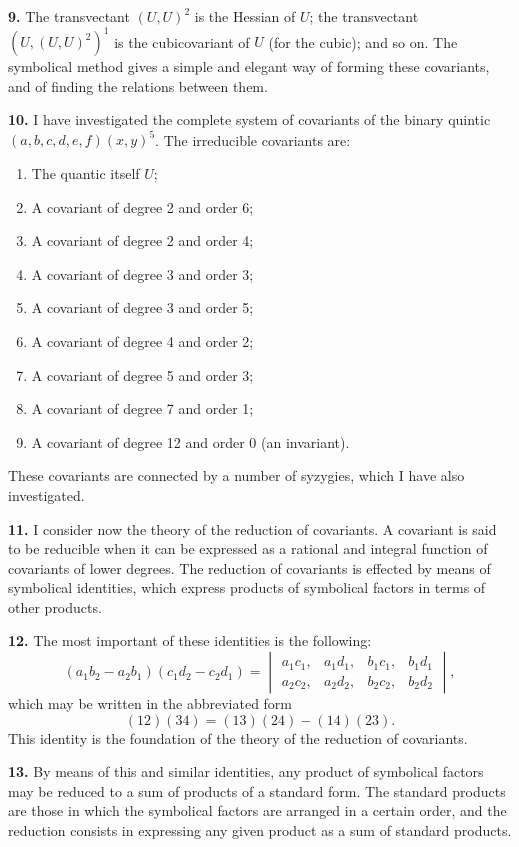 \documentclass[12pt,a4paper]{article}
\begin{document}
\newpage
\setcounter{page}{250}

\textbf{9.} The transvectant $(U, U)^2$ is the Hessian of $U$; the transvectant $(U, (U, U)^2)^1$ is the cubicovariant of $U$ (for the cubic); and so on. The symbolical method gives a simple and elegant way of forming these covariants, and of finding the relations between them.

\textbf{10.} I have investigated the complete system of covariants of the binary quintic $(a, b, c, d, e, f)(x, y)^5$. The irreducible covariants are:
\begin{enumerate}
\item The quantic itself $U$;
\item A covariant of degree 2 and order 6;
\item A covariant of degree 2 and order 4;
\item A covariant of degree 3 and order 3;
\item A covariant of degree 3 and order 5;
\item A covariant of degree 4 and order 2;
\item A covariant of degree 5 and order 3;
\item A covariant of degree 7 and order 1;
\item A covariant of degree 12 and order 0 (an invariant).
\end{enumerate}
These covariants are connected by a number of syzygies, which I have also investigated.

\newpage
\setcounter{page}{251}

\textbf{11.} I consider now the theory of the reduction of covariants. A covariant is said to be reducible when it can be expressed as a rational and integral function of covariants of lower degrees. The reduction of covariants is effected by means of symbolical identities, which express products of symbolical factors in terms of other products.

\textbf{12.} The most important of these identities is the following:
\[
(a_1 b_2 - a_2 b_1)(c_1 d_2 - c_2 d_1) = \begin{vmatrix}
a_1 c_1, & a_1 d_1, & b_1 c_1, & b_1 d_1 \\
a_2 c_2, & a_2 d_2, & b_2 c_2, & b_2 d_2
\end{vmatrix},
\]
which may be written in the abbreviated form
\[
(12)(34) = (13)(24) - (14)(23).
\]
This identity is the foundation of the theory of the reduction of covariants.

\textbf{13.} By means of this and similar identities, any product of symbolical factors may be reduced to a sum of products of a standard form. The standard products are those in which the symbolical factors are arranged in a certain order, and the reduction consists in expressing any given product as a sum of standard products.
\end{document}
